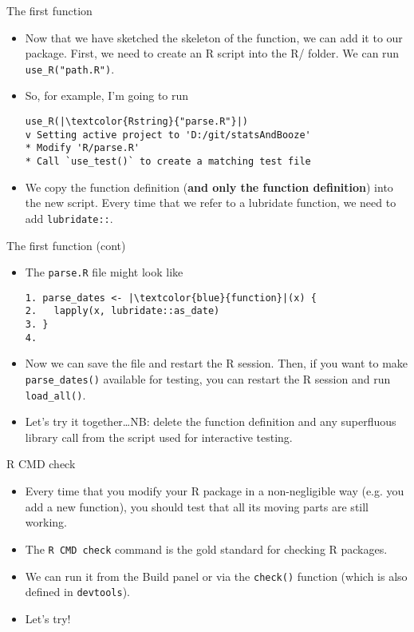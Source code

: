 \documentclass[
hyperref={bookmarks=false},
xcolor={dvipsnames,svgnames*,x11names*}, 
12pt
]{beamer}
\begin{document}
\begin{frame}[fragile]{The first function}
\vspace{-0.5cm}
\begin{itemize}
\itemsep 2ex
\item Now that we have sketched the skeleton of the function, we can add it to our package. First, we need to create an R script into the R/ folder. We can run \texttt{use\_R(\textcolor{Rstring}{"path.R"})}. 
\item So, for example, I'm going to run 
\begin{lstlisting}
use_R(|\textcolor{Rstring}{"parse.R"}|)
v Setting active project to 'D:/git/statsAndBooze'
* Modify 'R/parse.R'
* Call `use_test()` to create a matching test file
\end{lstlisting}
\item We copy the function definition (\textbf{and only the function definition}) into the new script. Every time that we refer to a lubridate function, we need to add \texttt{lubridate::}. 
\end{itemize}
\end{frame}

\begin{frame}[fragile]{The first function (cont)}
\vspace{-0.5cm}
\begin{itemize}
\itemsep 2ex
\item The \texttt{parse.R} file might look like 
\begin{lstlisting}
1. parse_dates <- |\textcolor{blue}{function}|(x) {
2.   lapply(x, lubridate::as_date)
3. }
4. 
\end{lstlisting}
\item Now we can save the file and restart the R session. Then, if you want to make \texttt{parse\_dates()} available for testing, you can restart the R session and run \texttt{load\_all()}. 
\item Let's try it together\dots \;NB: delete the function definition and any superfluous library call from the script used for interactive testing. 
\end{itemize}
\end{frame}

\begin{frame}[fragile]{R CMD check}
\vspace{-0.5cm}
\begin{itemize}
\itemsep 3ex
\item Every time that you modify your R package in a non-negligible way (e.g. you add a new function), you should test that all its moving parts are still working. 
\item The \texttt{R CMD check} command is the gold standard for checking R packages. 
\item We can run it from the Build panel or via the \texttt{check()} function (which is also defined in \texttt{devtools}). 
\item Let's try!
\end{itemize}
\end{frame}
\end{document}
